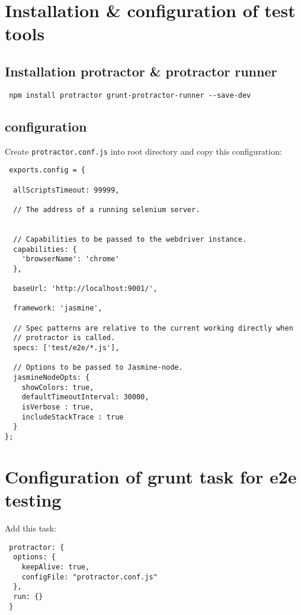 \documentclass{report}
\begin{document}
\section*{Installation \& configuration of test tools}

\subsection*{Installation protractor \& protractor runner}

\begin{verbatim}
 npm install protractor grunt-protractor-runner --save-dev
\end{verbatim}

\subsection*{configuration}

Create \verb+protractor.conf.js+ into root directory and copy this configuration:

\begin{verbatim}
 exports.config = {
  
  allScriptsTimeout: 99999,
 
  // The address of a running selenium server.
 

  // Capabilities to be passed to the webdriver instance.
  capabilities: {
    'browserName': 'chrome'
  },
 
  baseUrl: 'http://localhost:9001/',
 
  framework: 'jasmine',
 
  // Spec patterns are relative to the current working directly when
  // protractor is called.
  specs: ['test/e2e/*.js'],
 
  // Options to be passed to Jasmine-node.
  jasmineNodeOpts: {
    showColors: true,
    defaultTimeoutInterval: 30000,
    isVerbose : true,
    includeStackTrace : true
  }
};
\end{verbatim}

\section*{Configuration of grunt task for e2e testing}

Add this task:
\begin{verbatim}
 protractor: {
  options: {
    keepAlive: true,
    configFile: "protractor.conf.js"
  },
  run: {}
 }
\end{verbatim}
\end{document}
